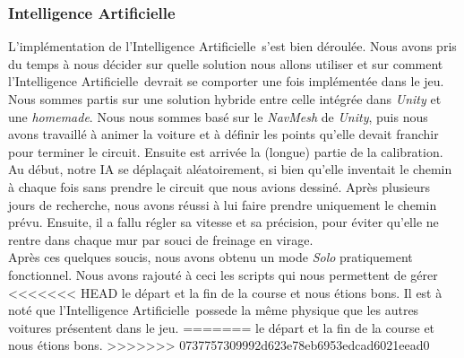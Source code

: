 \documentclass[a4paper,12pt]{article}
\newcommand{\AI}{Intelligence Artificielle}
\begin{document}
            \subsubsection{\AI}
                L'implémentation de l'\AI\, s'est bien déroulée. Nous avons pris du temps
                à nous décider sur quelle solution nous allons utiliser et sur comment
                l'\AI\, devrait se comporter une fois implémentée dans le jeu. Nous sommes partis sur une
                solution hybride entre celle intégrée dans \textsl{Unity} et une \textit{homemade}.
                Nous nous sommes basé sur le \textit{NavMesh} de \textsl{Unity}, puis nous avons
                travaillé à animer la voiture et à définir les points qu'elle devait franchir pour
                terminer le circuit. Ensuite est arrivée
                la (longue) partie de la calibration. Au début, notre IA se déplaçait aléatoirement,
                si bien qu'elle inventait le chemin à chaque fois sans prendre le circuit que nous
                avions dessiné. Après plusieurs jours de recherche, nous avons réussi à lui faire
                prendre uniquement le chemin prévu. Ensuite, il a fallu régler sa vitesse et sa
                précision, pour éviter qu'elle ne rentre dans chaque mur par souci de freinage en virage.\\
                Après ces quelques soucis, nous avons obtenu un mode \textsl{Solo} pratiquement
                fonctionnel. Nous avons rajouté à ceci les scripts qui nous permettent de gérer
<<<<<<< HEAD
                le départ et la fin de la course et nous étions bons. Il est à noté que l'\AI\ possede la même 
                physique que les autres voitures présentent dans le jeu.
=======
                le départ et la fin de la course et nous étions bons.
>>>>>>> 0737757309992d623e78eb6953edcad6021eead0
\end{document}
